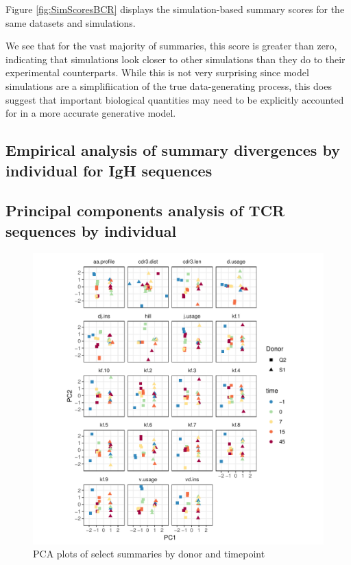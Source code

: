 \documentclass{article}
\begin{document}
Figure \ref{fig:SimScoresBCR} displays the simulation-based summary scores for the same datasets and simulations.


We see that for the vast majority of summaries, this score is greater than zero, indicating that simulations look closer to other simulations than they do to their experimental counterparts.
While this is not very surprising since model simulations are a simplifiication of the true data-generating process, this does suggest that important biological quantities may need to be explicitly accounted for in a more accurate generative model.


\subsection*{Empirical analysis of summary divergences by individual for IgH sequences}

\subsection*{Principal components analysis of TCR sequences by individual}

\begin{figure}
    \includegraphics[width=\linewidth]{Figures/tcr_pca.pdf}
    \caption{PCA plots of select summaries by donor and timepoint}
    \label{fig:TCR_PCA}
\end{figure}
\end{document}
